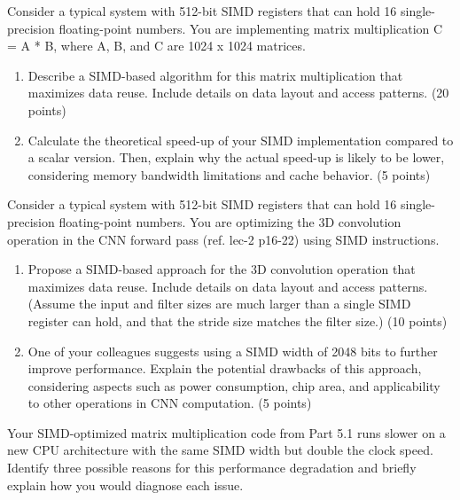 \documentclass[a4 paper]{article}
\begin{document}

Consider a typical system with 512-bit SIMD registers that can hold 16 single-precision floating-point numbers. You are implementing matrix multiplication C = A * B, where A, B, and C are 1024 x 1024 matrices.

\begin{enumerate}
    \item  Describe a SIMD-based algorithm for this matrix multiplication that maximizes data reuse. Include details on data layout and access patterns. (20 points)
    \item  Calculate the theoretical speed-up of your SIMD implementation compared to a scalar version. Then, explain why the actual speed-up is likely to be lower, considering memory bandwidth limitations and cache behavior. (5 points)
\end{enumerate}

\solution{}



Consider a typical system with 512-bit SIMD registers that can hold 16 single-precision floating-point numbers. You are optimizing the 3D convolution operation in the CNN forward pass (ref. lec-2 p16-22) using SIMD instructions.

\begin{enumerate}
    \item Propose a SIMD-based approach for the 3D convolution operation that maximizes data reuse. Include details on data layout and access patterns. (Assume the input and filter sizes are much larger than a single SIMD register can hold, and that the stride size matches the filter size.) (10 points)
    \item One of your colleagues suggests using a SIMD width of 2048 bits to further improve performance. Explain the potential drawbacks of this approach, considering aspects such as power consumption, chip area, and applicability to other operations in CNN computation. (5 points)
\end{enumerate}

\solution{}



Your SIMD-optimized matrix multiplication code from Part 5.1 runs slower on a new CPU architecture with the same SIMD width but double the clock speed. Identify three possible reasons for this performance degradation and briefly explain how you would diagnose each issue.


\solution{}
\end{document}
